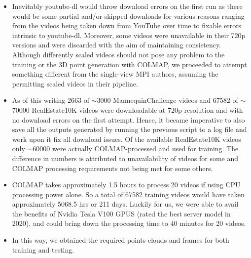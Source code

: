 \begin{itemize}
    \item Inevitably youtube-dl would throw download errors on the first run as there would be some partial and/or skipped downloads for various reasons ranging from the videos being taken down from YouTube over time to fixable errors intrinsic to youtube-dl. Moreover, some videos were unavailable in their 720p versions and were discarded with the aim of maintaining consistency. Although differently scaled videos should not pose any problem to the training or the 3D point generation with COLMAP, we proceeded to attempt something different from the single-view MPI authors, assuming the permitting scaled videos in their pipeline.
    
    \item As of this writing 2663 of $\sim$3000 MannequinChallenge videos and 67582 of $\sim$70000 RealEstate10K videos were downloadable at 720p resolution and with no download errors on the first attempt. Hence, it became imperative to also save all the outputs generated by running the previous script to a log file and work upon it fix all download issues. Of the available RealEstate10K videos only $\sim$60000 were actually COLMAP-processed and used for training. The difference in numbers is attributed to unavailability of videos for some and COLMAP processing requirements not being met for some others.
    
    \item COLMAP takes approximately 1.5 hours to process 20 videos if using CPU processing power alone. So a total of 67582 training videos would have taken approximately 5068.5 hrs or 211 days. Luckily for us, we were able to avail the benefits of Nvidia Tesla V100 GPUS (rated the best server model in 2020), and could bring down the processing time to 40 minutes for 20 videos.
    
    \item In this way, we obtained the required points clouds and frames for both training and testing. 
    
\end{itemize}





